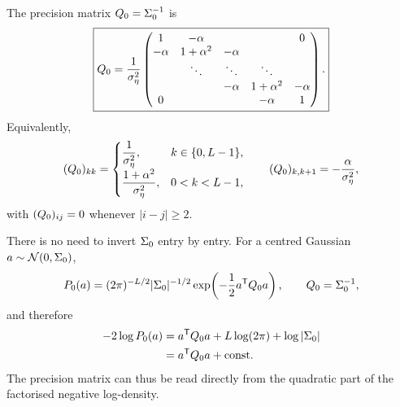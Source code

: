 \begin{proposition}\label{prop:g-Q0}
The precision matrix $Q_0=\Sigma_0^{-1}$ is
\begin{equation}
  \boxed{
  Q_0
  =
  \frac{1}{\sigma_\eta^2}
  \begin{pmatrix}
    1          & -\alpha       &              &              & 0\\
    -\alpha    & 1+\alpha^2    & -\alpha      &              & \\
               & \ddots        & \ddots       & \ddots       & \\
               &               & -\alpha      & 1+\alpha^2   & -\alpha\\
    0          &               &              & -\alpha      & 1
  \end{pmatrix}.
  }
  \label{eq:g-Q0}
\end{equation}
Equivalently,
\begin{equation}
  (Q_0)_{kk}
  =
  \begin{cases}
    \dfrac{1}{\sigma_\eta^2},
      & k\in\{0,L-1\},\\[7pt]
    \dfrac{1+\alpha^2}{\sigma_\eta^2},
      & 0<k<L-1,
  \end{cases}
  \qquad
  (Q_0)_{k,k+1}
  =
  -\frac{\alpha}{\sigma_\eta^2},
\end{equation}
with $(Q_0)_{ij}=0$ whenever $|i-j|\geq2$.
\end{proposition}

There is no need to invert $\Sigma_0$ entry by entry. For a centred Gaussian
$a\sim\mathcal{N}(0,\Sigma_0)$,
\begin{equation}
  P_0(a)
  =
  (2\pi)^{-L/2}|\Sigma_0|^{-1/2}
  \exp\!\left(-\frac12 a^{\mathsf{T}}Q_0 a\right),
  \qquad
  Q_0=\Sigma_0^{-1},
  \label{eq:g-gaussian-precision}
\end{equation}
and therefore
\begin{align}
  -2\log P_0(a)
  &=
  a^{\mathsf{T}}Q_0 a
  +L\log(2\pi)+\log|\Sigma_0| \\
  &=
  a^{\mathsf{T}}Q_0 a+\mathrm{const}.
  \label{eq:g-read-precision}
\end{align}
The precision matrix can thus be read directly from the quadratic part of
the factorised negative log-density.

